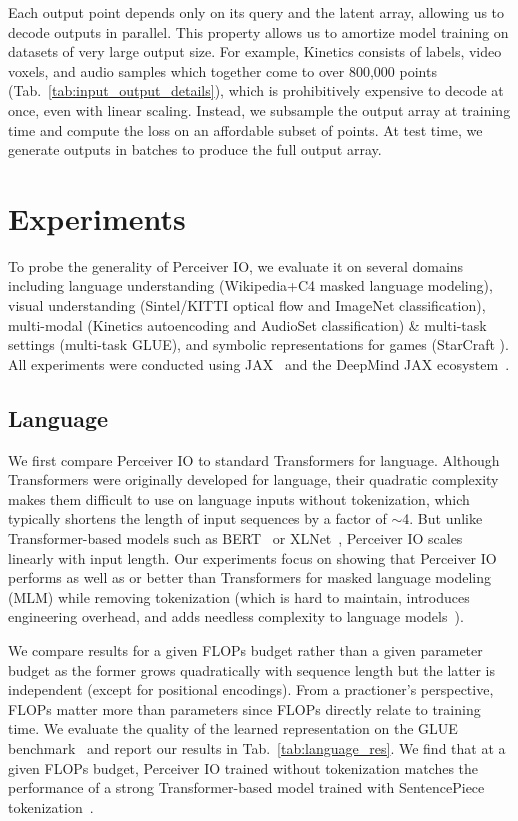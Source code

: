 \documentclass{article} %
\newcommand{\ourmodel}{Perceiver IO\xspace}
\begin{document}
Each output point depends only on its query and the latent array, allowing us to decode outputs in parallel. This property allows us to amortize model training on datasets of very large output size. For example, Kinetics consists of labels, video voxels, and audio samples which together come to over 800,000 points (Tab.~\ref{tab:input_output_details}), which is prohibitively expensive to decode at once, even with linear scaling. Instead, we subsample the output array at training time and compute the loss on an affordable subset of points. At test time, we generate outputs in batches to produce the full output array.

\vspace{-8pt}
\section{Experiments}

To probe the generality of \ourmodel{}, we evaluate it on several domains including language understanding (Wikipedia+C4 masked language modeling), visual understanding (Sintel/KITTI optical flow and ImageNet classification), multi-modal (Kinetics autoencoding and AudioSet classification) \& multi-task settings (multi-task GLUE), and symbolic representations for games (StarCraft ). All experiments were conducted using JAX~\citep{jax2018github} and the DeepMind JAX ecosystem~\citep{deepmind2020jax}.

\subsection{Language}
\label{sec:language}

We first compare \ourmodel{} to standard Transformers for language. Although Transformers were originally developed for language, their quadratic complexity makes them difficult to use on language inputs without tokenization, which typically shortens the length of input sequences by a factor of $\sim$4. But unlike Transformer-based models such as BERT~\citep{devlin2019bert} or XLNet~\citep{yang2019xlnet}, \ourmodel{} scales linearly with input length. Our experiments focus on showing that \ourmodel{} performs as well as or better than Transformers for masked language modeling (MLM) while removing tokenization (which is hard to maintain, introduces engineering overhead, and adds needless complexity to language models~\citep{bostrom2020bytes-bad, clark2021canine}).

We compare results for a given FLOPs budget rather than a given parameter budget as the former grows quadratically with sequence length but the latter is independent (except for positional encodings). From a practioner's perspective, FLOPs matter more than parameters since FLOPs directly relate to training time. We evaluate the quality of the learned representation on the GLUE benchmark~\citep{wang2018glue} and report our results in Tab.~\ref{tab:language_res}. We find that at a given FLOPs budget, \ourmodel{} trained without tokenization matches the performance of a strong Transformer-based model trained with SentencePiece tokenization~\citep{sennrich2016bpe,kudo2018sentencepiece}.
\end{document}

